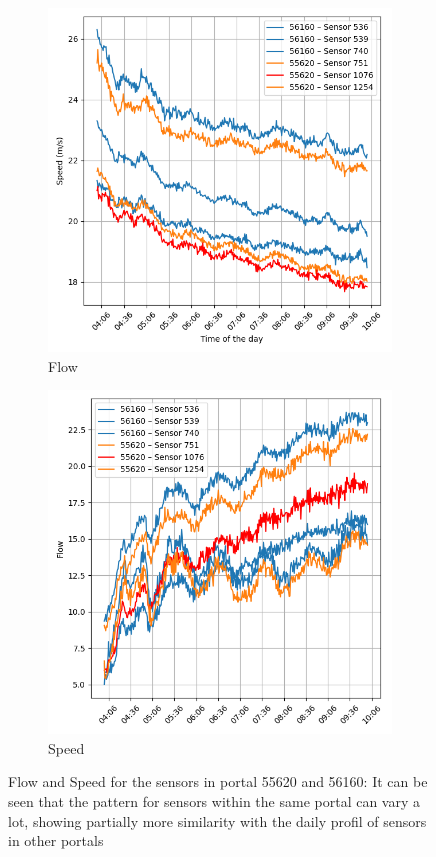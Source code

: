 	\begin{figure}[H]
		\centering
		\begin{subfigure}{0.49 \linewidth}
			\includegraphics[width=\textwidth]{../Plots/Speed/avg_speed_day_per_sensor_portal}
			\caption{Flow}
		\end{subfigure}
		\begin{subfigure}{0.49 \linewidth}
			\includegraphics[width=\textwidth]{../Plots/Flow/avg_flow_day_per_sensor_portal}
			\caption{Speed}
		\end{subfigure}
		\caption{Flow and Speed for the sensors in portal 55620 and 56160: It can be seen that the pattern for sensors within the same portal can vary a lot, showing partially more similarity with the daily profil of sensors in other portals }
		\label{fig:speed_and_flow_sensors}
	\end{figure}

